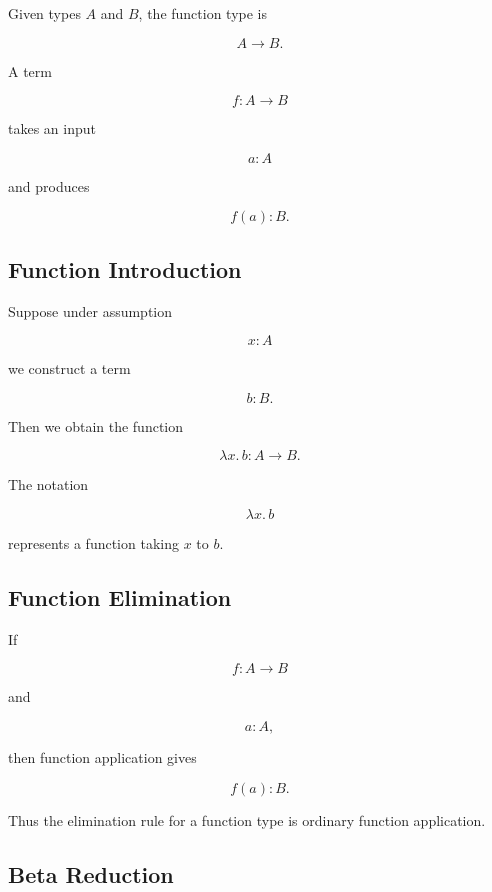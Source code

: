 Given types \(A\) and \(B\), the function type is

\[
\boxed{
A\to B.
}
\]

A term

\[
f:A\to B
\]

takes an input

\[
a:A
\]

and produces

\[
\boxed{
f(a):B.
}
\]

\subsection{Function Introduction}
\label{subsec:function-type-introduction}

Suppose under assumption

\[
x:A
\]

we construct a term

\[
b:B.
\]

Then we obtain the function

\[
\boxed{
\lambda x.\,b
:
A\to B.
}
\]

The notation

\[
\lambda x.\,b
\]

represents a function taking \(x\) to \(b\).

\subsection{Function Elimination}
\label{subsec:function-type-elimination}

If

\[
f:A\to B
\]

and

\[
a:A,
\]

then function application gives

\[
\boxed{
f(a):B.
}
\]

Thus the elimination rule for a function type is ordinary function
application.

\subsection{Beta Reduction}
\label{subsec:beta-reduction}

